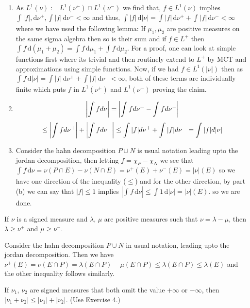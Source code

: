 \documentclass[12pt,a4paper]{article}
\begin{document}
\begin{solution}
\begin{enumerate}[label=\alph*.]
\item As $L^1(\nu):=L^1(\nu^+)\cap L^1(\nu^-)$ we find that, $f\in L^1(\nu)$ implies $ \int_{}^{}|f|,\mathrm{d}\nu^+, \int_{}^{}|f|\,\mathrm{d}\nu^-<\infty$ and thus, $ \int_{}^{}|f|\,\mathrm{d}|\nu|= \int_{}^{}|f|\,\mathrm{d}\nu^++ \int_{}^{}|f|\,\mathrm{d}\nu^-<\infty$ where we have used the following lemma: If $\mu_1,\mu_2$ are positive measures on the same sigma algebra then so is their sum and if $f\in L^+$ then $ \int_{}^{}f\,\mathrm{d}(\mu_1+\mu_2)= \int_{}^{}f\,\mathrm{d}\mu_1+ \int_{}^{}f\,\mathrm{d}\mu_2$. 
For a proof, one can look at simple functions first where its trivial and then routinely extend to $L^+$ by MCT and approximations using simple functions. 
Now, if we had $f\in L^1(|\nu|)$ then as $ \int_{}^{}f\,\mathrm{d}|\nu|=\int_{}^{}|f|\,\mathrm{d}\nu^++ \int_{}^{}|f|\,\mathrm{d}\nu^-<\infty$, both of these terms are individually finite which puts $f$ in $L^1(\nu^+)$ and $L^1(\nu^-)$ proving the claim.
\item \[
    \qty|\int fd\nu|=\qty|\int fd\nu^+-\int fd\nu^-|
\]
\[\leq\qty|\int fd\nu^+|+\qty|\int fd\nu^-|\leq\int|f|d\nu^++\int|f|d\nu^-=\int|f|d|\nu|
\]
 
\item Consider the hahn decomposition $P\cup N$ is usual notation leading upto the jordan decomposition, then letting $f=\chi_P-\chi_N$ we see that $ \int_{}^{}f\,\mathrm{d}\nu=\nu(P\cap E)-\nu(N\cap E)=\nu^+(E)+\nu^-(E)=|\nu|(E)$ so we have one direction of the inequality ($\leq$) and for the other direction, by part (b) we can say that $|f|\leq 1$ implies $|\int_{}^{}f\,\mathrm{d}\nu|\leq \int_{}^{}1\,\mathrm{d}|\nu|=|\nu|(E).$ so we are done.
\end{enumerate}
\end{solution}
\begin{problem}\label{prob:3-4}
If $\nu$ is a signed measure and $\lambda$, $\mu$ are positive measures such that $\nu=\lambda-\mu$, then $\lambda\ge\nu^{+}$ and $\mu\ge\nu^{-}$.
\end{problem}
\begin{solution}
Consider the hahn decomposition $P\cup N$ in usual notation, leading upto the jordan decomposition. 
Then we have $\nu^+(E)=\nu(E\cap P)=\lambda(E\cap P)-\mu(E\cap P)\leq\lambda(E\cap P)\leq\lambda(E)$ and the other inequality follows similarly. 
\end{solution}
\begin{problem}\label{prob:3-5}
If $\nu_{1}$, $\nu_{2}$ are signed measures that both omit the value $+\infty$ or $-\infty$, then $|\nu_{1}+\nu_{2}|\le|\nu_{1}|+|\nu_{2}|$. (Use Exercise 4.)
\end{problem}
\end{document}
